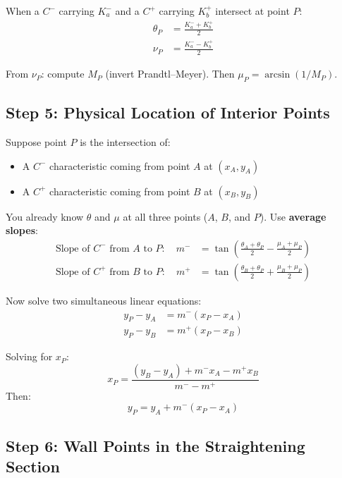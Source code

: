 \documentclass[11pt]{article}
\begin{document}
When a $C^-$ carrying $K^-_a$ and a $C^+$ carrying $K^+_b$ intersect at point $P$:
\begin{align}
    \theta_P &= \frac{K^-_a + K^+_b}{2} \\[6pt]
    \nu_P &= \frac{K^-_a - K^+_b}{2}
\end{align}

From $\nu_P$: compute $M_P$ (invert Prandtl--Meyer). Then $\mu_P = \arcsin(1/M_P)$.

\subsection{Step 5: Physical Location of Interior Points}

Suppose point $P$ is the intersection of:
\begin{itemize}
    \item A $C^-$ characteristic coming from point $A$ at $(x_A, y_A)$
    \item A $C^+$ characteristic coming from point $B$ at $(x_B, y_B)$
\end{itemize}

You already know $\theta$ and $\mu$ at all three points ($A$, $B$, and $P$). Use \textbf{average slopes}:
\begin{align}
    \text{Slope of } C^- \text{ from } A \text{ to } P: \quad m^- &= \tan\!\left(\frac{\theta_A + \theta_P}{2} - \frac{\mu_A + \mu_P}{2}\right) \\[6pt]
    \text{Slope of } C^+ \text{ from } B \text{ to } P: \quad m^+ &= \tan\!\left(\frac{\theta_B + \theta_P}{2} + \frac{\mu_B + \mu_P}{2}\right)
\end{align}

Now solve two simultaneous linear equations:
\begin{align}
    y_P - y_A &= m^-(x_P - x_A) \\
    y_P - y_B &= m^+(x_P - x_B)
\end{align}

Solving for $x_P$:
\begin{equation}
    x_P = \frac{(y_B - y_A) + m^- x_A - m^+ x_B}{m^- - m^+}
\end{equation}
Then:
\begin{equation}
    y_P = y_A + m^-(x_P - x_A)
\end{equation}

\subsection{Step 6: Wall Points in the Straightening Section}
\end{document}
